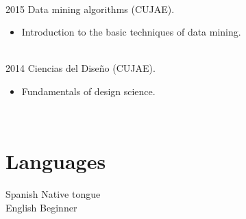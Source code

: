 \documentclass[letterpaper]{twentysecondcv} %
\begin{document}
\begin{twenty}
{{\begin{itemize}
		\end{itemize}}
        }
        \\
\twentyitem
    	{2015}
		{}
        {Data mining algorithms (CUJAE).}
        {}
        {}
        {
        {\begin{itemize}
        \item Introduction to the basic techniques of data mining.
		\end{itemize}}
        }
         \\
\twentyitem
    	{2014}
		{}
        {Ciencias del Diseño (CUJAE).}
        {}
        {}
        {
        {\begin{itemize}
        \item Fundamentals of design science.
		\end{itemize}}
        }

\end{twenty}
\pagebreak

\begin{twenty}
\twentyitem
    	{}
		{}
        {}
        {}
        {}
        {}
        \\
 \end{twenty} 
\section{Languages}

\begin{twenty} %
\twentyitem
    	{Spanish}
		{}
        {Native tongue}
        {}
        {}
        {}
        \\
	\twentyitem
    	{English}
		{}
        {Beginner}
        {}
        {}
        {}


\end{twenty}

\end{document}
